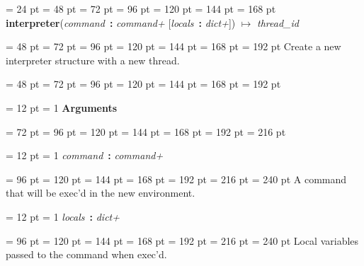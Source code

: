 {{{{{{{{\par}
\par}
\par}
\par}
\par}
\par}
\par}
{\par \noindent  \leftskip = 24 pt  \leftmargini = 48 pt  \leftmarginii = 72 pt  \leftmarginiii = 96 pt  \leftmarginiv = 120 pt  \leftmarginv = 144 pt  \leftmarginvi = 168 pt {\bf {\large {\bf interpreter\/}}\/}({\em command\/}~{\bf :}  {\em command+\/}  {[}{\em locals\/}~{\bf :}  {\em dict+\/}]) \(\mapsto \)  {\em thread{\_}id\/}{\par \noindent
{\par \noindent  \leftskip = 48 pt  \leftmargini = 72 pt  \leftmarginii = 96 pt  \leftmarginiii = 120 pt  \leftmarginiv = 144 pt  \leftmarginv = 168 pt  \leftmarginvi = 192 pt  Create a new interpreter structure with a new thread.\par}
{\par \noindent  \leftskip = 48 pt  \leftmargini = 72 pt  \leftmarginii = 96 pt  \leftmarginiii = 120 pt  \leftmarginiv = 144 pt  \leftmarginv = 168 pt  \leftmarginvi = 192 pt {\par \noindent
{\par \pagebreak[3.100000] \noindent \hangindent = 12 pt \hangafter = 1 
{\bf Arguments\/}\par}
{\par \noindent  \leftskip = 72 pt  \leftmargini = 96 pt  \leftmarginii = 120 pt  \leftmarginiii = 144 pt  \leftmarginiv = 168 pt  \leftmarginv = 192 pt  \leftmarginvi = 216 pt {\par \noindent
{\par \pagebreak[3.000000] \noindent \hangindent = 12 pt \hangafter = 1 
{\em command\/}~{\bf :}  {\em command+\/}\par}
{\par \noindent  \leftskip = 96 pt  \leftmargini = 120 pt  \leftmarginii = 144 pt  \leftmarginiii = 168 pt  \leftmarginiv = 192 pt  \leftmarginv = 216 pt  \leftmarginvi = 240 pt  A command that will be exec'd in the new environment.\par}
{\par \pagebreak[3.000000] \noindent \hangindent = 12 pt \hangafter = 1 
{\em locals\/}~{\bf :}  {\em dict+\/}\par}
{\par \noindent  \leftskip = 96 pt  \leftmargini = 120 pt  \leftmarginii = 144 pt  \leftmarginiii = 168 pt  \leftmarginiv = 192 pt  \leftmarginv = 216 pt  \leftmarginvi = 240 pt  Local variables passed to the command when exec'd.\par}
}}}}}}}

